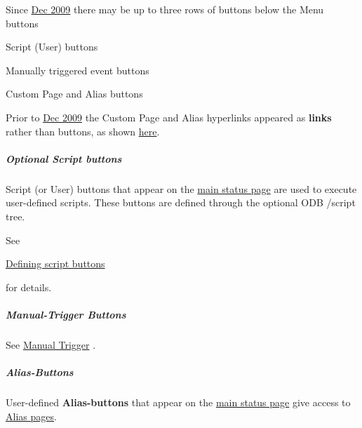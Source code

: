  Since \hyperlink{NDF_ndf_dec_2009}{Dec 2009}  there may be up to three rows of buttons below the Menu buttons
\begin{DoxyItemize}
\item Script (User) buttons
\item Manually triggered event buttons
\item Custom Page and Alias buttons
\end{DoxyItemize}

 Prior to \hyperlink{NDF_ndf_dec_2009}{Dec 2009}  the Custom Page and Alias hyperlinks appeared as {\bfseries links} rather than buttons, as shown \hyperlink{RC_mhttpd_status_page_redesign_RC_mhttpd_old_alias_buttons}{here}.

\par


\par
 \label{RC_mhttpd_status_page_features_idx_mhttpd_buttons_script}
\hypertarget{RC_mhttpd_status_page_features_idx_mhttpd_buttons_script}{}
 \hypertarget{RC_mhttpd_status_page_features_RC_mhttpd_status_script_buttons}{}\subparagraph{Optional Script buttons}\label{RC_mhttpd_status_page_features_RC_mhttpd_status_script_buttons}
Script (or User) buttons that appear on the \hyperlink{RC_mhttpd_status_page_features_RC_mhpptd_optional_buttons}{main status page} are used to execute user-\/defined scripts. These buttons are defined through the optional ODB /script tree.

See
\begin{DoxyItemize}
\item \hyperlink{RC_mhttpd_defining_script_buttons}{Defining script buttons}
\end{DoxyItemize}

for details.

\par


\par
 \label{RC_mhttpd_status_page_features_idx_manual-trigger_button}
\hypertarget{RC_mhttpd_status_page_features_idx_manual-trigger_button}{}
 \hypertarget{RC_mhttpd_status_page_features_RC_mhttpd_status_Manual_Trigger_buttons}{}\subparagraph{Manual-\/Trigger Buttons}\label{RC_mhttpd_status_page_features_RC_mhttpd_status_Manual_Trigger_buttons}
See \hyperlink{FE_eq_event_routines_FE_manual_trigger}{Manual Trigger} .

\par


\par
 \hypertarget{RC_mhttpd_status_page_features_RC_mhttpd_status_Alias_buttons}{}\subparagraph{Alias-\/Buttons}\label{RC_mhttpd_status_page_features_RC_mhttpd_status_Alias_buttons}
User-\/defined {\bfseries Alias-\/buttons} that appear on the \hyperlink{RC_mhttpd_status_page_features_RC_mhpptd_optional_buttons}{main status page} give access to \hyperlink{RC_mhttpd_Alias_page}{Alias pages}.


